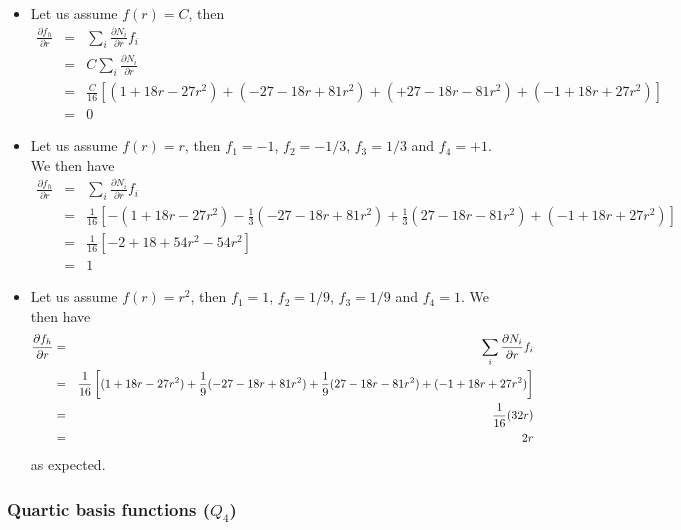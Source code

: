 \begin{itemize}
\item
Let us assume $f(r)=C$, then
\begin{eqnarray}
\frac{\partial f_h}{\partial r} 
&=& \sum_i \frac{\partial N_i}{\partial r} f_i  \nonumber\\
&=&  C \sum_i \frac{\partial N_i}{\partial r}  \nonumber\\
&=& \frac{C}{16} [  (  1 +18r - 27r^2 ) 
+ (-27 -18r + 81r^2 )  
+  (+27 -18r - 81r^2 ) 
+ ( -1 +18r + 27r^2 ) ]  \nonumber\\
&=& 0 \nonumber
\end{eqnarray}

\item
Let us assume $f(r)= r$, then $f_1=-1$, $f_2=-1/3$, $f_3=1/3$ and $f_4=+1$. We then have
\begin{eqnarray}
\frac{\partial f_h}{\partial r} 
&=& \sum_i \frac{\partial N_i}{\partial r} f_i  \nonumber\\
&=& \frac{1}{16} [  -(  1 +18r - 27r^2 ) 
 -\frac{1}{3} (-27 -18r + 81r^2 )  
 +\frac{1}{3} (27 -18r - 81r^2 )
 + ( -1 +18r + 27r^2 ) ]  \nonumber\\
&=& \frac{1}{16} [-2 + 18 + 54r^2 - 54r^2] \nonumber\\
&=& 1 \nonumber
\end{eqnarray}

\item
Let us assume $f(r)= r^2$, then $f_1=1$, $f_2=1/9$, $f_3=1/9$ and $f_4=1$. We then have
\begin{eqnarray}
\frac{\partial f_h}{\partial r} 
&=& \sum_i \frac{\partial N_i}{\partial r} f_i  \nonumber\\
&=& \frac{1}{16} \left[  
(  1 +18r - 27r^2 ) 
+\frac19 (-27 -18r + 81r^2 )  
+\frac19  (27 -18r - 81r^2 )
+ ( -1 +18r + 27r^2 ) \right]  \nonumber\\
&=& \frac{1}{16}(32r) \nonumber\\
&=& 2r
\end{eqnarray}
as expected.




\end{itemize}

\subsubsection{Quartic basis functions ($Q_4$) \label{sec:bf4}}

